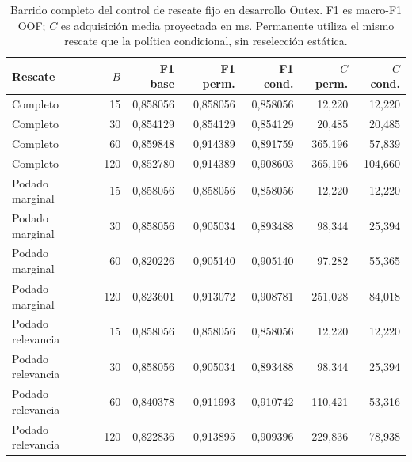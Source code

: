 \begin{table}[!htbp]
\centering\fontsize{8}{10}\selectfont
\caption{Barrido completo del control de rescate fijo en desarrollo Outex. F1 es macro-F1 OOF; $C$ es adquisición media proyectada en ms. Permanente utiliza el mismo rescate que la política condicional, sin reselección estática.}
\label{tab:p0-barrido}
\begin{tabular}{@{}lr rrr rr@{}}
\toprule
Rescate & $B$ & F1 base & F1 perm. & F1 cond. & $C$ perm. & $C$ cond.\\
\midrule
Completo & 15 & 0,858056 & 0,858056 & 0,858056 & 12,220 & 12,220\\
Completo & 30 & 0,854129 & 0,854129 & 0,854129 & 20,485 & 20,485\\
Completo & 60 & 0,859848 & 0,914389 & 0,891759 & 365,196 & 57,839\\
Completo & 120 & 0,852780 & 0,914389 & 0,908603 & 365,196 & 104,660\\
Podado marginal & 15 & 0,858056 & 0,858056 & 0,858056 & 12,220 & 12,220\\
Podado marginal & 30 & 0,858056 & 0,905034 & 0,893488 & 98,344 & 25,394\\
Podado marginal & 60 & 0,820226 & 0,905140 & 0,905140 & 97,282 & 55,365\\
Podado marginal & 120 & 0,823601 & 0,913072 & 0,908781 & 251,028 & 84,018\\
Podado relevancia & 15 & 0,858056 & 0,858056 & 0,858056 & 12,220 & 12,220\\
Podado relevancia & 30 & 0,858056 & 0,905034 & 0,893488 & 98,344 & 25,394\\
Podado relevancia & 60 & 0,840378 & 0,911993 & 0,910742 & 110,421 & 53,316\\
Podado relevancia & 120 & 0,822836 & 0,913895 & 0,909396 & 229,836 & 78,938\\
\bottomrule
\end{tabular}
\end{table}
